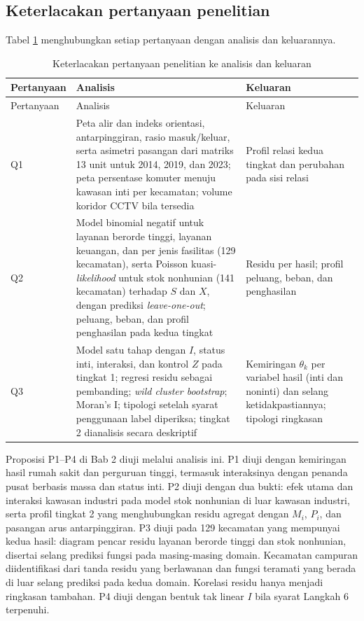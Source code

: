 \documentclass[12pt,a4paper,oneside,openany,indonesian]{report}
\begin{document}
\subsection{Keterlacakan pertanyaan
penelitian}\label{keterlacakan-pertanyaan-dan-analisis-asosiasi}

Tabel \ref{tab:bab3-keterlacakan} menghubungkan setiap pertanyaan
dengan analisis dan keluarannya.

\begingroup
\footnotesize
\begin{longtable}{>{\raggedright\arraybackslash}p{} >{\raggedright\arraybackslash}p{} >{\raggedright\arraybackslash}p{}}
\caption{Keterlacakan pertanyaan penelitian ke analisis dan keluaran}\label{tab:bab3-keterlacakan}\\
\toprule
Pertanyaan & Analisis & Keluaran \\
\midrule
\endfirsthead
\toprule
Pertanyaan & Analisis & Keluaran \\
\midrule
\endhead
\bottomrule
\endlastfoot
Q1 & Peta alir dan indeks orientasi, antarpinggiran, rasio masuk/keluar, serta asimetri pasangan dari matriks 13 unit untuk 2014, 2019, dan 2023; peta persentase komuter menuju kawasan inti per kecamatan; volume koridor CCTV bila tersedia & Profil relasi kedua tingkat dan perubahan pada sisi relasi \\
Q2 & Model binomial negatif untuk layanan berorde tinggi, layanan keuangan, dan per jenis fasilitas (129 kecamatan), serta Poisson kuasi-\emph{likelihood} untuk stok nonhunian (141 kecamatan) terhadap $S$ dan $X$, dengan prediksi \emph{leave-one-out}; peluang, beban, dan profil penghasilan pada kedua tingkat & Residu per hasil; profil peluang, beban, dan penghasilan \\
Q3 & Model satu tahap dengan $I$, status inti, interaksi, dan kontrol $Z$ pada tingkat 1; regresi residu sebagai pembanding; \emph{wild cluster bootstrap}; Moran's I; tipologi setelah syarat penggunaan label diperiksa; tingkat 2 dianalisis secara deskriptif & Kemiringan $\theta_k$ per variabel hasil (inti dan noninti) dan selang ketidakpastiannya; tipologi ringkasan \\
\end{longtable}
\endgroup

Proposisi P1--P4 di Bab 2 diuji melalui analisis ini. P1 diuji dengan
kemiringan hasil rumah sakit dan perguruan tinggi, termasuk interaksinya
dengan penanda pusat berbasis massa dan status inti. P2 diuji dengan dua
bukti: efek utama dan interaksi kawasan industri pada model stok
nonhunian di luar kawasan industri, serta profil tingkat 2 yang
menghubungkan residu agregat dengan $M_i$, $P_i$, dan pasangan arus
antarpinggiran. P3 diuji pada 129 kecamatan yang mempunyai kedua hasil:
diagram pencar residu layanan berorde tinggi dan stok nonhunian, disertai
selang prediksi fungsi pada masing-masing domain. Kecamatan campuran
diidentifikasi dari tanda residu yang berlawanan dan fungsi teramati
yang berada di luar selang prediksi pada kedua domain. Korelasi residu hanya
menjadi ringkasan tambahan. P4 diuji dengan bentuk tak linear $I$ bila
syarat Langkah 6 terpenuhi.
\end{document}
